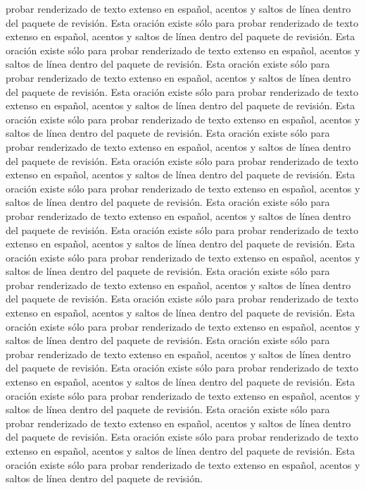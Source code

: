 probar renderizado de texto extenso en español, acentos y saltos de línea dentro del paquete de revisión. Esta oración existe sólo para probar renderizado de texto extenso en español, acentos y saltos de línea dentro del paquete de revisión. Esta oración existe sólo para probar renderizado de texto extenso en español, acentos y saltos de línea dentro del paquete de revisión. Esta oración existe sólo para probar renderizado de texto extenso en español, acentos y saltos de línea dentro del paquete de revisión. Esta oración existe sólo para probar renderizado de texto extenso en español, acentos y saltos de línea dentro del paquete de revisión. Esta oración existe sólo para probar renderizado de texto extenso en español, acentos y saltos de línea dentro del paquete de revisión. Esta oración existe sólo para probar renderizado de texto extenso en español, acentos y saltos de línea dentro del paquete de revisión. Esta oración existe sólo para probar renderizado de texto extenso en español, acentos y saltos de línea dentro del paquete de revisión. Esta oración existe sólo para probar renderizado de texto extenso en español, acentos y saltos de línea dentro del paquete de revisión. Esta oración existe sólo para probar renderizado de texto extenso en español, acentos y saltos de línea dentro del paquete de revisión. Esta oración existe sólo para probar renderizado de texto extenso en español, acentos y saltos de línea dentro del paquete de revisión. Esta oración existe sólo para probar renderizado de texto extenso en español, acentos y saltos de línea dentro del paquete de revisión. Esta oración existe sólo para probar renderizado de texto extenso en español, acentos y saltos de línea dentro del paquete de revisión. Esta oración existe sólo para probar renderizado de texto extenso en español, acentos y saltos de línea dentro del paquete de revisión. Esta oración existe sólo para probar renderizado de texto extenso en español, acentos y saltos de línea dentro del paquete de revisión. Esta oración existe sólo para probar renderizado de texto extenso en español, acentos y saltos de línea dentro del paquete de revisión. Esta oración existe sólo para probar renderizado de texto extenso en español, acentos y saltos de línea dentro del paquete de revisión. Esta oración existe sólo para probar renderizado de texto extenso en español, acentos y saltos de línea dentro del paquete de revisión. Esta oración existe sólo para probar renderizado de texto extenso en español, acentos y saltos de línea dentro del paquete de revisión. Esta oración existe sólo para probar renderizado de texto extenso en español, acentos y saltos de línea dentro del paquete de revisión. Esta oración existe sólo para probar renderizado de texto extenso en español, acentos y saltos de línea dentro del paquete de revisión. 
